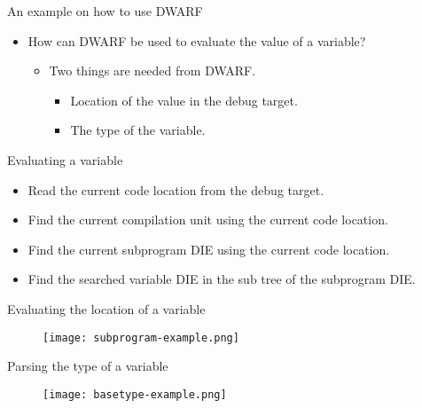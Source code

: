 
\begin{frame}{An example on how to use DWARF}
	\begin{itemize}
	    \item How can DWARF be used to evaluate the value of a variable?
		\begin{itemize}
		    \item Two things are needed from DWARF.
			\begin{itemize}
			    \item Location of the value in the debug target.
			    \item The type of the variable.
			\end{itemize}
		\end{itemize}
	\end{itemize}
\end{frame}


\begin{frame}{Evaluating a variable}
	\begin{itemize}
		\item Read the current code location from the debug target.
		\item Find the current compilation unit using the current code location.
		\item Find the current subprogram DIE using the current code location.
		\item Find the searched variable DIE in the sub tree of the subprogram DIE. 
	\end{itemize}
\end{frame}


\begin{frame}{Evaluating the location of a variable}
	\begin{figure}
		\texttt{[image: subprogram-example.png]}
	\end{figure}
\end{frame}


\begin{frame}{Parsing the type of a variable}
	\begin{figure}
		\texttt{[image: basetype-example.png]}
	\end{figure}
\end{frame}

